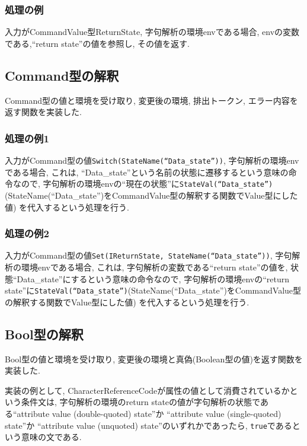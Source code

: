\documentclass[uplatex,a4j]{jsreport}
\begin{document}
\subsubsection{処理の例}
入力がCommandValue型ReturnState, 字句解析の環境envである場合, 
envの変数である,``return state''の値を参照し, その値を返す. 

\subsection{Command型の解釈}
Command型の値と環境を受け取り, 変更後の環境, 排出トークン, エラー内容を返す関数を実装した. 

\subsubsection{処理の例1}
入力がCommand型の値\texttt{Switch(StateName(``Data_state''))}, 字句解析の環境envである場合, 
これは, ``Data_state''という名前の状態に遷移するという意味の命令なので, 
字句解析の環境envの``現在の状態''に\texttt{StateVal(``Data_state'')}(StateName(``Data_state'')をCommandValue型の解釈する関数でValue型にした値)
を代入するという処理を行う. 
\subsubsection{処理の例2}
入力がCommand型の値\texttt{Set(IReturnState, StateName(``Data_state''))}, 字句解析の環境envである場合, 
これは, 字句解析の変数である``return state''の値を, 状態``Data_state''にするという意味の命令なので, 
字句解析の環境envの``return state''に\texttt{StateVal(``Data_state'')}(StateName(``Data_state'')をCommandValue型の解釈する関数でValue型にした値)
を代入するという処理を行う.

\subsection{Bool型の解釈}
Bool型の値と環境を受け取り, 変更後の環境と真偽(Boolean型の値)を返す関数を実装した. 

実装の例として, 
CharacterReferenceCodeが属性の値として消費されているかという条件文は, 
字句解析の環境のreturn stateの値が字句解析の状態である``attribute value (double-quoted) state''か 
``attribute value (single-quoted) state''か ``attribute value (unquoted) state''のいずれかであったら, 
\texttt{true}であるという意味の文である. 
\end{document}
